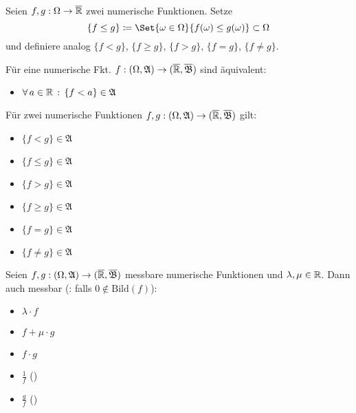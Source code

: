 \documentclass{cheat-sheet}
\newcommand{\Alg}{\mathfrak{A}} %
\newcommand{\Bor}{\mathfrak{B}} %
\theoremstyle{definition}
\begin{document}
\begin{nota}
  Seien $f, g : \Omega \to \overline{\mathbb{R}}$ zwei numerische Funktionen. Setze
    \[ \{ f \leq g \} \coloneqq \Set{ \omega \in \Omega }{ f(\omega) \leq g(\omega) } \subset \Omega \]
  und definiere analog $\{ f < g \}$, $\{ f \geq g \}$, $\{ f > g \}$, $\{ f = g \}$, $\{ f \not= g \}$.
\end{nota}

\begin{satz}
  Für eine numerische Fkt. $f : (\Omega, \Alg) \to (\ER, \overline{\Bor})$ sind äquivalent:
  \begin{itemize}
    \miniitem{0.7 \linewidth}{$\fa{a \in \R} \{ f \geq a \} = f^{-1}([a, \infty]) \in \Alg$}
    \item $\fa{a \in \R} \{ f < a \} \in \Alg$
  \end{itemize}
\end{satz}

\begin{satz}
  Für zwei numerische Funktionen $f, g : (\Omega, \Alg) \to (\ER, \overline{\Bor})$ gilt:
  \begin{multicols}{3}
    \begin{itemize}
      \item $\{ f < g \} \in \Alg$
      \item $\{ f \leq g \} \in \Alg$
      \item $\{ f > g \} \in \Alg$
      \item $\{ f \geq g \} \in \Alg$
      \item $\{ f = g \} \in \Alg$
      \item $\{ f \not= g \} \in \Alg$
    \end{itemize}
  \end{multicols}
\end{satz}

\begin{satz}
  Seien $f, g : (\Omega, \Alg) \to (\ER, \overline{\Bor})$ messbare numerische Funktionen und $\lambda, \mu \in \mathbb{R}$. Dann auch messbar (\ddag: falls $0 \not\in \mathrm{Bild}(f)$):
  \begin{multicols}{5}
    \begin{itemize}
      \item $\lambda \cdot f$
      \item $f + \mu \cdot g$
      \item $f \cdot g$
      \item $\tfrac{1}{f}$ (\ddag)
      \item $\tfrac{g}{f}$ (\ddag)
    \end{itemize}
  \end{multicols}
\end{satz}
\end{document}
